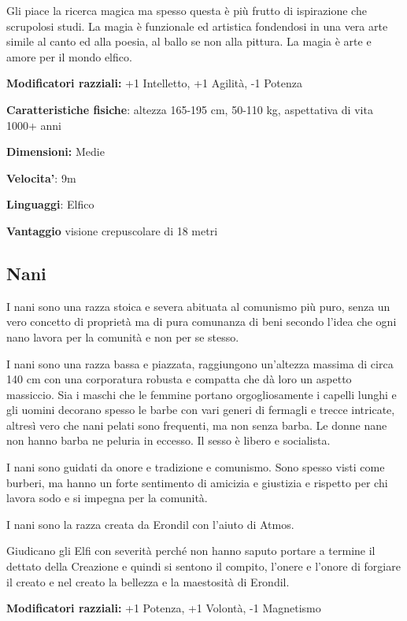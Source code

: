 \documentclass[a4paper,11pt,twoside,openany]{book}
\begin{document}
Gli piace la ricerca magica ma spesso questa è più frutto di ispirazione che scrupolosi studi. La magia è funzionale ed artistica fondendosi in una vera arte simile al canto ed alla poesia, al ballo se non alla pittura.
La magia è arte e amore per il mondo elfico.


\textbf{Modificatori razziali:} +1 Intelletto, +1 Agilità, -1 Potenza

\textbf{Caratteristiche fisiche}: altezza 165-195 cm, 50-110 kg, aspettativa
di vita 1000+ anni

\textbf{Dimensioni:} Medie

\textbf{Velocita'}: 9m

\textbf{Linguaggi}: Elfico

\textbf{Vantaggio} visione crepuscolare di 18 metri

\subsection{Nani}

\label{nani}

I nani sono una razza stoica e severa abituata al comunismo più puro, senza un vero concetto di proprietà ma di pura comunanza di beni secondo l'idea che ogni nano lavora per la comunità e non per se stesso.

I nani sono una razza bassa e piazzata, raggiungono un'altezza massima di circa 140 cm con una corporatura robusta e compatta che dà loro un aspetto massiccio. Sia i maschi che le femmine portano orgogliosamente i capelli lunghi e gli uomini decorano spesso le barbe con vari generi di fermagli e trecce intricate, altresì vero che nani pelati sono frequenti, ma non senza barba. Le donne nane non hanno barba ne peluria in eccesso. Il sesso è libero e socialista.

I nani sono guidati da onore e tradizione e comunismo. Sono spesso visti come burberi, ma hanno un forte sentimento di amicizia e giustizia e rispetto per chi lavora sodo e si impegna per la comunità.

I nani sono la razza creata da Erondil con l'aiuto di Atmos.

Giudicano gli Elfi con severità perché non hanno saputo portare a termine il dettato della Creazione e quindi si sentono il compito, l'onere e l'onore di forgiare il creato e nel creato la bellezza e la maestosità di Erondil.

\textbf{Modificatori razziali:} +1 Potenza, +1 Volontà, -1 Magnetismo
\end{document}
